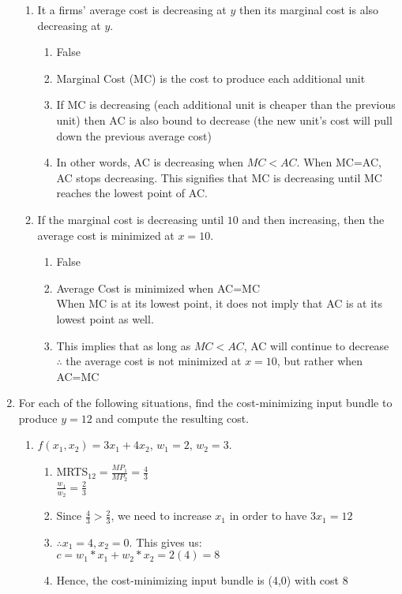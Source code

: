 \documentclass[11pt]{article}
\begin{document}
\begin{enumerate}
\begin{enumerate}
        \item It a firms' average cost is decreasing at $y$ then its marginal cost is also decreasing at $y$.
        \begin{enumerate}
            \item False
            \item Marginal Cost (MC) is the cost to produce each additional unit
            \item If MC is decreasing (each additional unit is cheaper than the previous unit) then AC is also bound to decrease (the new unit's cost will pull down the previous average cost)
            \item In other words, AC is decreasing when $MC<AC$. When MC=AC, AC stops decreasing. This signifies that MC is decreasing until MC reaches the lowest point of AC.
        \end{enumerate}

        \item If the marginal cost is decreasing until $10$ and then increasing, then the average cost is minimized at $x=10$.
        \begin{enumerate}
            \item False
            \item Average Cost is minimized when AC=MC\\
            When MC is at its lowest point, it does not imply that AC is at its lowest point as well.
            \item This implies that as long as $MC<AC$, AC will continue to decrease\\
            $\therefore$ the average cost is not minimized at $x=10$, but rather when AC=MC
            
        \end{enumerate}

    \end{enumerate}

\item For each of the following situations, find the cost-minimizing input bundle to produce $y=12$ and compute the resulting cost.
    \begin{enumerate}
        \item $f(x_{1},x_{2})=3x_{1}+4x_{2}$, $w_{1}=2$, $w_{2}=3$.
        \begin{enumerate}
            \item MRTS$_{12} = \frac{MP_1}{MP_2} = \frac{4}{3}$\\
            $\frac{w_1}{w_2}=\frac{2}{3}$
            \item Since $\frac{4}{3} > \frac{2}{3}$, we need to increase $x_1$ in order to have $3x_1 = 12$
            \item $\therefore x_1 = 4, x_2 = 0$. This gives us:\\
            $c = w_1 * x_1 + w_2*x_2 = 2(4) = 8$
            \item Hence, the cost-minimizing input bundle is (4,0) with cost 8
        \end{enumerate}


\end{enumerate}
\end{enumerate}
\end{document}
